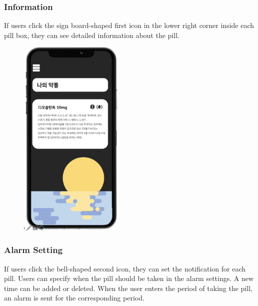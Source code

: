 \documentclass[conference]{IEEEtran}
\begin{document}
\subsubsection{Information}
If users click the sign board-shaped first icon in the lower right corner inside each pill box, they can see detailed information about the pill. \\

\begin{figure}[h!]
\centering
\includegraphics[width=5cm]{final_image_folder/pillbox_info.png}
\caption{}
\label{fig:map}
\end{figure}

\subsubsection{Alarm Setting}
If users click the bell-shaped second icon, they can set the notification for each pill. Users can specify when the pill should be taken in the alarm settings. A new time can be added or deleted. When the user enters the period of taking the pill, an alarm is sent for the corresponding period.\\
\end{document}
